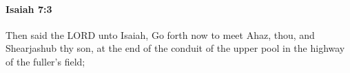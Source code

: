 
		\paragraph{Isaiah 7:3} %
			\label{ISAIAH-7-3}

			Then said the LORD unto Isaiah, Go forth now to meet Ahaz, thou, and Shearjashub thy son, at the end of the conduit of the upper pool in the highway of the fuller's field;


